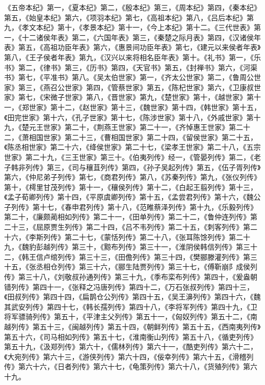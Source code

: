 \documentclass[12pt,UTF8]{ctexbook}
\begin{document}
《五帝本纪》第一，《夏本纪》第二，《殷本纪》第三，《周本纪》第四，《秦本纪》第五，《始皇本纪》第六，《项羽本纪》第七，《高祖本纪》第八，《吕后本纪》第九，《孝文本纪》第十，《孝景本纪》第十一，《今上本纪》第十二。《三代世表》第一，《十二诸侯年表》第二，《六国年表》第三，《秦楚之际月表》第四，《汉诸侯年表》第五，《高祖功臣年表》第六，《惠景间功臣年表》第七，《建元以来侯者年表》第八，《王子侯者年表》第九，《汉兴以来将相名臣年表》第十。《礼书》第一，《乐书》第二，《律书》第三，《历书》第四，《天官书》第五，《封禅书》第六，《河渠书》第七，《平准书》第八。《吴太伯世家》第一，《齐太公世家》第二，《鲁周公世家》第三，《燕召公世家》第四，《管蔡世家》第五，《陈杞世家》第六，《卫康叔世家》第七，《宋微子世家》第八，《晋世家》第九，《楚世家》第十，《越世家》第十一，《郑世家》第十二，《赵世家》第十三，《魏世家》第十四，《韩世家》第十五，《田完世家》第十六，《孔子世家》第十七，《陈涉世家》第十八，《外戚世家》第十九，《楚元王世家》第二十，《荆燕王世家》第二十一，《齐悼惠王世家》第二十二，《萧相国世家》第二十三，《曹相国世家》第二十四，《留侯世家》第二十五，《陈丞相世家》第二十六，《绛侯世家》第二十七，《梁孝王世家》第二十八，《五宗世家》第二十九，《三王世家》第三十。《伯夷列传》经一，《管晏列传》第二，《老子韩非列传》第三，《司与穰苴列传》第四，《孙子吴起列传》第五，《伍子胥列传》第六，《仲尼弟子列传》第七，《商君列传》第八，《苏秦列传》第九，《张仪列传》第十，《樗里甘茂列传》第十一，《穰侯列传》第十二，《白起王翦列传》第十三，《孟子荀卿列传》第十四，《平原虞卿列传》第十五，《孟尝君列传》第十六，《魏公子列传》第十七，《春申君列传》第十八，《范睢蔡泽列传》第十九，《乐毅列传》第二十，《廉颇蔺相如列传》第二十一，《田单列传》第二十二，《鲁仲连列传》第二十三，《屈原贾生列传》第二十四，《吕不韦列传》第二十五，《刺客列传》第二十六，《李斯列传》第二十七，《蒙恬列传》第二十八，《张耳陈馀列传》第二十九，《魏豹彭越列传》第三十，《黥布列传》第三十一，《淮阴侯韩信列传》第三十二，《韩王信卢绾列传》第三十三，《田儋列传》第三十四，《樊郦滕灌列传》第三十五，《张丞相仓列传》第三十六，《郦生陆贾列传》第三十七，《傅靳崩阝成侯列传》第三十八，《刘敬叔孙通列传》第三十九，《季布栾布列传》第四十，《爰盎朝错列传》第四十一，《张释之冯唐列传》第四十二，《万石张叔列传》第四十三，《田叔列传》第四十四，《扁鹊仓公列传》第四十五，《吴王濞列传》第四十六，《魏其武安列传》第四十七，《韩长孺列传》第四十八，《李将军列传》第四十九，《卫将军骠骑列传》第五十，《平津主父列传》第五十一，《匈奴列传》第五十二，《南越列传》第五十三，《闽越列传》第五十四，《朝鲜列传》第五十五，《西南夷列传》第五十六，《司马相如列传》第五十七，《淮南衡山列传》第五十八，《循吏列传》第五十九，《汲郑列传》第六十，《儒林列传》第六十一，《酷吏列传》第六十二，《大宛列传》第六十三，《游侠列传》第六十四，《佞幸列传》第六十五，《滑稽列传》第六十六，《日者列传》第六十七，《龟策列传》第六十八，《货殖列传》第六十九。
\end{document}
